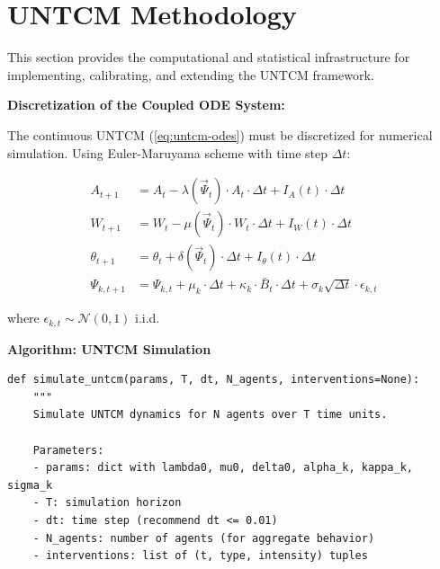 
\section{UNTCM Methodology}
\label{sec:untcm-methodology}

This section provides the computational and statistical infrastructure for implementing, calibrating, and extending the UNTCM framework.

\begin{tcolorbox}[colback=blue!5!white, colframe=blue!75!black,
    title=\textbf{Method UNTCM-M1: Computational Implementation}]

\textbf{Discretization of the Coupled ODE System:}

The continuous UNTCM (\ref{eq:untcm-odes}) must be discretized for numerical simulation. Using Euler-Maruyama scheme with time step $\Delta t$:

\begin{equation}
\boxed{
\begin{aligned}
A_{t+1} &= A_t - \lambda(\vec{\Psi}_t) \cdot A_t \cdot \Delta t + I_A(t) \cdot \Delta t \\
W_{t+1} &= W_t - \mu(\vec{\Psi}_t) \cdot W_t \cdot \Delta t + I_W(t) \cdot \Delta t \\
\theta_{t+1} &= \theta_t + \delta(\vec{\Psi}_t) \cdot \Delta t + I_\theta(t) \cdot \Delta t \\
\Psi_{k,t+1} &= \Psi_{k,t} + \mu_k \cdot \Delta t + \kappa_k \cdot \bar{B}_t \cdot \Delta t + \sigma_k \sqrt{\Delta t} \cdot \epsilon_{k,t}
\end{aligned}
}
\label{eq:untcm-discrete}
\end{equation}

where $\epsilon_{k,t} \sim \mathcal{N}(0,1)$ i.i.d.

\textbf{Algorithm: UNTCM Simulation}

\begin{verbatim}
def simulate_untcm(params, T, dt, N_agents, interventions=None):
    """
    Simulate UNTCM dynamics for N agents over T time units.

    Parameters:
    - params: dict with lambda0, mu0, delta0, alpha_k, kappa_k, sigma_k
    - T: simulation horizon
    - dt: time step (recommend dt <= 0.01)
    - N_agents: number of agents (for aggregate behavior)
    - interventions: list of (t, type, intensity) tuples


\end{verbatim}
\end{tcolorbox}
